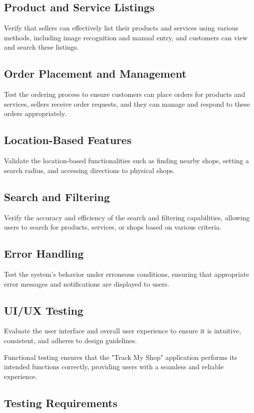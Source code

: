 \subsection{Product and Service Listings} Verify that sellers can effectively list their products and services using various methods, including image recognition and manual entry, and customers can view and search these listings.

\subsection{Order Placement and Management} Test the ordering process to ensure customers can place orders for products and services, sellers receive order requests, and they can manage and respond to these orders appropriately.

\subsection{Location-Based Features} Validate the location-based functionalities such as finding nearby shops, setting a search radius, and accessing directions to physical shops.

\subsection{Search and Filtering} Verify the accuracy and efficiency of the search and filtering capabilities, allowing users to search for products, services, or shops based on various criteria.

\subsection{Error Handling} Test the system's behavior under erroneous conditions, ensuring that appropriate error messages and notifications are displayed to users.

\subsection{UI/UX Testing} Evaluate the user interface and overall user experience to ensure it is intuitive, consistent, and adheres to design guidelines.
	

Functional testing ensures that the "Track My Shop" application performs its intended functions correctly, providing users with a seamless and reliable experience.


\subsection{Testing Requirements}

